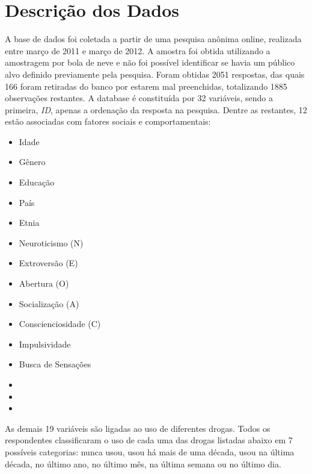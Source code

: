 \documentclass[
	article,			%
	11pt,				%
	oneside,			%
	a4paper,			%
	english,			%
	brazil,				%
	sumario=tradicional
	]{abntex2}
\begin{document}
\section{Descrição dos Dados}

A base de dados foi coletada a partir de uma pesquisa anônima online, realizada entre março de 2011 e março de 2012. A amostra foi obtida utilizando a amostragem por bola de neve e não foi possível identificar se havia um público alvo definido previamente pela pesquisa. Foram obtidas 2051 respostas,  das quais 166 foram retiradas do banco por estarem mal preenchidas, totalizando 1885 observações restantes. 
A database é constituída por 32 variáveis, sendo a primeira, \emph{ID}, apenas a ordenação da resposta na pesquisa. Dentre as restantes, 12 estão associadas com fatores sociais e comportamentais:

\begin{multicols}{3}
    \begin{itemize}
        \item Idade
        \item Gênero
        \item Educação
        \item País
        \item Etnia

        \item Neuroticismo (N)
        \item Extroversão (E)
        \item Abertura (O)
        \item Socialização (A)
        \item Conscienciosidade (C)

        \item Impulsividade
        \item Busca de Sensações
        \item[]
        \item[]
        \item[]
        
    \end{itemize}
\end{multicols}

As demais 19 variáveis são ligadas ao uso de diferentes drogas. Todos os respondentes classificaram o uso de cada uma das drogas listadas abaixo em 7 possíveis categorias: nunca usou, usou há mais de uma década, usou na última década, no último ano, no último mês, na última semana ou no último dia.
\end{document}
